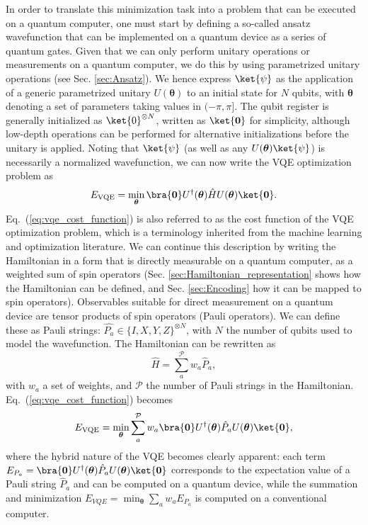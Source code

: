 In order to translate this minimization task into a problem that can be executed on a quantum computer, one must start by defining a so-called ansatz wavefunction that can be implemented on a quantum device as a series of quantum gates. Given that we can only perform unitary operations or measurements on a quantum computer, we do this by using parametrized unitary operations (see Sec. \ref{sec:Ansatz}). We hence express $\ket{\psi}$ as the application of a generic parametrized unitary $U(\boldsymbol{\theta})$ to an initial state for $N$ qubits, with $\boldsymbol{\theta}$ denoting a set of parameters taking values in $(-\pi, \pi]$. The qubit register is generally initialized as $\ket{0}^{\otimes N}$, written as $\ket{\boldsymbol{0}}$ for simplicity, although low-depth operations can be performed for alternative initializations before the unitary is applied. Noting that $\ket{\psi}$ (as well as any $U(\boldsymbol{\theta}) \ket{\psi}$) is necessarily a normalized wavefunction, we can now write the VQE optimization problem as
\begin{equation} \label{eq:vqe_cost_function}
    E_{\mathrm{VQE}} = \min_{\boldsymbol{\theta}} \bra{\boldsymbol{0}} U^{\dagger}(\boldsymbol{\theta})\hat{H}  U(\boldsymbol{\theta}) \ket{\boldsymbol{0}}.
\end{equation}
Eq.~(\ref{eq:vqe_cost_function}) is also referred to as the cost function of the VQE optimization problem, which is a terminology inherited from the machine learning and optimization literature. 
We can continue this description by writing the Hamiltonian in a form that is directly measurable on a quantum computer, as a weighted sum of spin operators (Sec. \ref{sec:Hamiltonian_representation} shows how the Hamiltonian can be defined, and Sec. \ref{sec:Encoding} how it can be mapped to spin operators). Observables suitable for direct measurement on a quantum device are tensor products of spin operators (Pauli operators). We can define these as Pauli strings: $\hat{P_{a}} \in \{I, X, Y, Z\}^{\otimes N}$, with $N$ the number of qubits used to model the wavefunction. The Hamiltonian can be rewritten as
\begin{equation}
    \hat{H} = \sum_{a}^{\mathcal{P}} w_{a} \hat{P}_{a},
\end{equation}
with $w_a$ a set of weights, and $\mathcal{P}$ the number of Pauli strings in the Hamiltonian. Eq.~(\ref{eq:vqe_cost_function}) becomes
\begin{equation} \label{eq:vqe_hybrid_function}
    E_{\mathrm{VQE}} = \min_{\boldsymbol{\theta}} \sum_a^{\mathcal{P}} w_a \bra{\boldsymbol{0}} U^{\dagger}(\boldsymbol{\theta})\hat{P}_{a}  U(\boldsymbol{\theta}) \ket{\boldsymbol{0}},
\end{equation}
where the hybrid nature of the VQE becomes clearly apparent: each term $E_{P_a} = \bra{\boldsymbol{0}} U^{\dagger}(\boldsymbol{\theta})\hat{P}_{a}  U(\boldsymbol{\theta}) \ket{\boldsymbol{0}}$ corresponds to the expectation value of a Pauli string $\hat{P}_a$ and can be computed on a quantum device, while the summation and minimization $E_{VQE} = \min_{\boldsymbol{\theta}} \sum_a w_a E_{P_a}$ is computed on a conventional computer.

